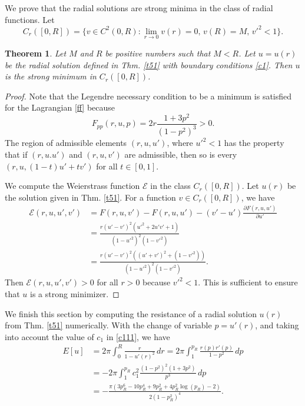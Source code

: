 \documentclass[a4paper,12pt]{amsart}
\newtheorem{theorem}{Theorem}[section]
\theoremstyle{definition}
\begin{document}
We prove that the radial solutions are strong minima in the class of radial functions. Let 
$$C_r([0,R])=\{v\in C^2(0,R)\colon  \lim_{r\to 0}v(r)=0,\,  v(R)=M,\, v'^2<1\}.$$

\begin{theorem} Let $M$ and $R$ be positive numbers such that $M<R$. Let $u=u(r)$ be the radial solution defined in Thm. \ref{t51} with boundary conditions \eqref{c1}. Then $u$ is the strong minimum in  $C_r([0,R])$.
\end{theorem}

\begin{proof} 
  Note that   the   Legendre necessary condition to be a minimum is satisfied for the Lagrangian \eqref{ff} because  
$$F_{pp}(r,u,p)=2r\frac{1+3p^2}{(1-p^2)^3}>0.$$
 The region of  admissible elements $(r,u,u')$, where $u'^2<1$ has the property that if $(r,u.u')$ and $(r,u,v')$ are admissible, then  so is every $(r,u,(1-t)u'+tv')$ for all $t\in [0,1]$.

  We   compute the Weierstrass function $\mathcal{E}$ in the class $C_r([0,R])$. Let $u(r)$ be  the solution given in Thm. \ref{t51}. For a function $v\in C_r([0,R])$, we have
\begin{equation*}
\begin{split}
\mathcal{E}(r,u,u',v')&=F(r,u,v')-F(r,u,u')-(v'-u')\frac{\partial F(r,u,u')}{\partial u'}\\
&=\frac{r (u'-v')^2 \left(u'^2+2 u' v'+1\right)}{\left(1-u'^2\right)^2 \left(1-v'^2\right)}\\
&=\frac{r (u'-v')^2((u'+v')^2+(1-v'^2))}{\left(1-u'^2\right)^2 \left(1-v'^2\right)}.
\end{split}
\end{equation*}
Then $\mathcal{E}(r,u,u',v')>0$ for all $r>0$ because $v'^2<1$. This is sufficient to ensure that $u$ is a strong minimizer. 
\end{proof}

We finish this section by computing   the resistance of a radial solution $u(r)$ from Thm. \ref{t51} numerically. With the change of variable $p=u'(r)$, and taking into account  the value of $c_1$ in \eqref{c111},  we have 
\begin{equation}\label{ee}
\begin{split}
E[u]&=2\pi\int_0^R\frac{r}{1-u'(r)^2}\, dr=2\pi\int_{1}^{p_R}\frac{r(p)r'(p)}{1-p^2}\, dp\\
&=-2\pi\int_{1}^{p_R}c_1^2\frac{(1-p^2)^2(1+3p^2)}{ p^3}\, dp\\
&=-\frac{\pi  \left(3 p_R^6-10 p_R^4+9 p_R^2+4 p_R^2 \log (p_R)-2\right)}{2 \left(1-p_R^2\right)^4}.
\end{split}
\end{equation}
\end{document}
